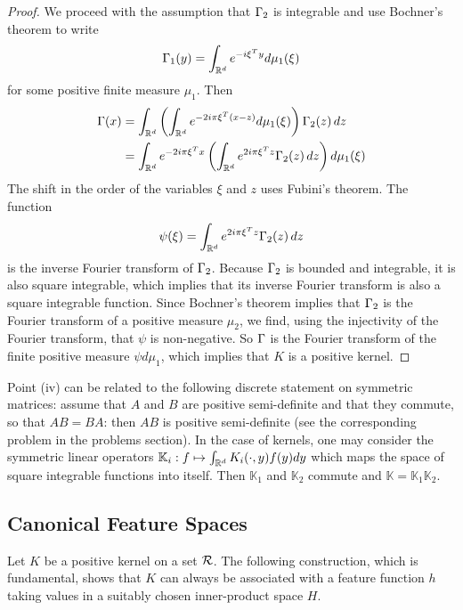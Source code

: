 \begin{proof}
We proceed with the assumption that $\Gamma_2$ is integrable and use Bochner's theorem to write 
\[
 \Gamma_1(y) = \int_{{\mathbb{R}}^d} e^{-i\xi^Ty} d\mu_1(\xi)
 \]
 for some positive finite measure $\mu_1$. Then
\begin{align*}
\Gamma(x) &= \int_{{\mathbb{R}}^d} \left(\int_{{\mathbb{R}}^d} e^{-2i\pi\xi^T(x-z)} d\mu_1(\xi)\right) \Gamma_2(z)\,dz\\
&= \int_{{\mathbb{R}}^d} e^{-2i\pi\xi^Tx} \left(\int_{{\mathbb{R}}^d} e^{2i\pi\xi^Tz}  \Gamma_2(z)\,dz\right) d\mu_1(\xi)\\
\end{align*}
The shift in the order of the variables $\xi$ and $z$ uses Fubini's theorem. The function
\[
\psi(\xi) = \int_{{\mathbb{R}}^d} e^{2i\pi\xi^Tz}  \Gamma_2(z)\,dz
\]
is the inverse Fourier transform of $\Gamma_2$. Because $\Gamma_2$ is bounded and integrable, it is also square integrable, which implies that its inverse Fourier transform is also a square integrable function. Since Bochner's theorem implies that $\Gamma_2$ is the Fourier transform of a positive measure $\mu_2$, we find, using the injectivity of the Fourier transform, that $\psi$ is non-negative. So $\Gamma$ is the Fourier transform of the finite positive measure $\psi d\mu_1$, which implies that $K$ is a positive kernel.
\end{proof}

Point (iv)  can be related to the following discrete statement on symmetric matrices: assume that $A$ and $B$ are positive semi-definite and that they commute, so that $AB = BA$: then $AB$ is positive semi-definite (see the corresponding problem in the problems section). 
In the case of kernels, one may consider the symmetric linear operators $\mathbb K_i : f \mapsto \int_{{\mathbb{R}}^d} K_i(\cdot,y) f(y) dy$ which maps the space of square integrable functions into itself. Then $\mathbb K_1$ and $\mathbb K_2$ commute and $\mathbb K = \mathbb K_1 \mathbb K_2$. 


\subsection{Canonical Feature Spaces}

Let $K$ be a positive kernel on a set ${\mathcal R}$. The following construction, which is fundamental, shows that $K$ can always be associated with a feature function $h$ taking values in a suitably chosen inner-product space $H$. 

